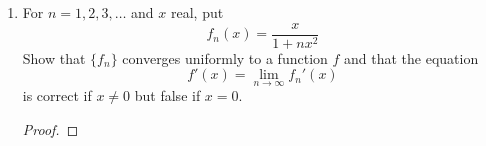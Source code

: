 \documentclass[../psets.tex]{subfiles}
\begin{document}
\begin{enumerate}[label={\textbf{\arabic*.}}]
\begin{proof}
\begin{align*}
            &= \left| x^2\sum_{k=n}^m(-1)^k\frac{1}{k^2}+\sum_{k=n}^m(-1)^k\frac{1}{k} \right|\\
            &\leq |x^2|\cdot\left| \sum_{k=n}^m(-1)^k\frac{1}{k^2} \right|+\left| \sum_{k=n}^m(-1)^k\frac{1}{k} \right|\\
            &\leq m^2\cdot\left| \sum_{k=n}^m(-1)^k\frac{1}{k^2} \right|+\left| \sum_{k=n}^m(-1)^k\frac{1}{k} \right|\\
            &< m^2\cdot\frac{\epsilon}{2m^2}+\frac{\epsilon}{2}\\
            &= \epsilon
        \end{align*}
        \endgroup
        as desired.\par
        To prove that the series does not converge absolutely for any value of $x$, let $x\in\R$ be arbitrary. Then
        \begin{align*}
            \sum_{n=1}^\infty\left| (-1)^n\frac{x^2+n}{n^2} \right| &= x^2\sum_{n=1}^\infty\frac{1}{n^2}+\sum_{n=1}^\infty\frac{1}{n}\\
            &= cx^2+\infty\tag*{Theorem 3.28}\\
            &= \infty
        \end{align*}
        as desired.
    \end{proof}
    \item For $n=1,2,3,\dots$ and $x$ real, put
    \begin{equation*}
        f_n(x) = \frac{x}{1+nx^2}
    \end{equation*}
    Show that $\{f_n\}$ converges uniformly to a function $f$ and that the equation
    \begin{equation*}
        f'(x) = \lim_{n\to\infty}f_n'(x)
    \end{equation*}
    is correct if $x\neq 0$ but false if $x=0$.
    \begin{proof}



\end{proof}
\end{enumerate}
\end{document}
